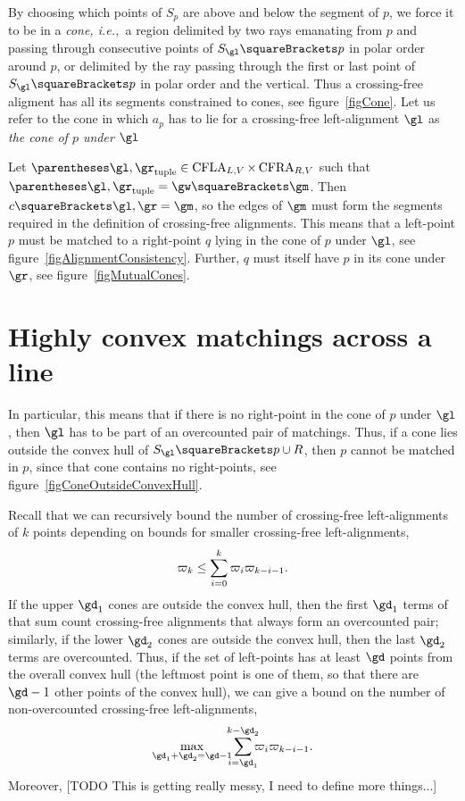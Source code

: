 \documentclass[10pt, a4paper, twoside]{basestyle}
\newcommand{\idest}{\emph{, i.e.,\ }}
\DeclareMathOperator{\CFLA}{CFLA}
\DeclareMathOperator{\CFRA}{CFRA}
\begin{document}
By choosing which points of $S_p$ are above and below the segment of $p$, we force it to be in a
\emph{cone}\idest a region delimited by two rays emanating from $p$ and passing through consecutive points
of $S_\gl\of p$ in polar order around $p$, or delimited by the ray passing through the first or last point
of $S_\gl\of p$ in polar order and the vertical. Thus a crossing-free aligment has all its segments constrained
to cones, see figure~\ref{figCone}. Let us refer to the cone in which $a_p$ has to lie for a crossing-free
left-alignment $\gl$ as \emph{the cone of $p$ under $\gl$}

Let $\tuple{\gl,\gr}\in \CFLA_{L,V}\Cartesian\CFRA_{R,V}$ such that $\tuple{\gl,\gr} = \gw\of\gm$.
Then $c\of{\gl,\gr}=\gm$, so the edges of $\gm$ must form the segments required in the definition
of crossing-free alignments. This means that a left-point $p$ must be matched to a right-point $q$
lying in the cone of $p$ under $\gl$, see figure~\ref{figAlignmentConsistency}.
Further, $q$ must itself have $p$ in its cone under $\gr$, see figure~\ref{figMutualCones}.
\section{Highly convex matchings across a line}
In particular, this means that if there is no right-point in the cone of $p$ under $\gl$,
then $\gl$ has to be part of an overcounted pair of matchings.
Thus, if a cone lies outside the convex hull of $S_\gl\of p\Union R$, then
$p$ cannot be matched in $p$, since that cone contains no right-points, see figure~\ref{figConeOutsideConvexHull}.

Recall that we can recursively bound the number of crossing-free left-alignments of $k$ points depending
on bounds for smaller crossing-free left-alignments,
\[\varpi_k\leq\sum{i=0}[k]\varpi_{i}\varpi_{k-i-1}\text.\]
If the upper $\gd_1$ cones are outside the convex hull, then the first $\gd_1$ terms of that sum count
crossing-free alignments that always form an overcounted pair; similarly, if the lower $\gd_2$ cones
are outside the convex hull, then the last $\gd_2$ terms are overcounted.
Thus, if the set of left-points has at least $\gd$ points from the overall convex hull (the leftmost
point is one of them, so that there are $\gd-1$ other points of the convex hull), we can give a bound
on the number of non-overcounted crossing-free left-alignments,
\[\max_{\gd_1+\gd_2=\gd-1}\sum{i=\gd_1}[k-\gd_2]\varpi_{i}\varpi_{k-i-1}\text.\]
Moreover, 
[TODO This is getting really messy, I need to define more things...]
\end{document}
